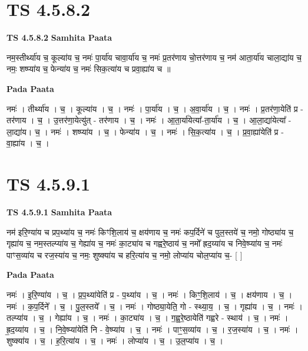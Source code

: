 \documentclass[17pt]{extarticle}
\begin{document}
\section*{ TS 4.5.8.2 }

\textbf{TS 4.5.8.2 } \newline
\textbf{Samhita Paata} \newline

नम॒स्तीर्थ्या॑य च॒ कूल्या॑य च॒ नमः॑ पा॒र्या॑य चावा॒र्या॑य च॒ नमः॑ प्र॒तर॑णाय चो॒त्तर॑णाय च॒ नम॑ आता॒र्या॑य चाला॒द्या॑य च॒ नमः॒ शष्प्या॑य च॒ फेन्या॑य च॒ नमः॑ सिक॒त्या॑य च प्रवा॒ह्या॑य च ॥ \newline

\textbf{Pada Paata} \newline

नमः॑ । तीर्थ्या॑य । च॒ । कूल्या॑य । च॒ । नमः॑ । पा॒र्या॑य । च॒ । अ॒वा॒र्या॑य । च॒ । नमः॑ । प्र॒तर॑णा॒येति॑ प्र - तर॑णाय । च॒ । उ॒त्तर॑णा॒येत्यु॑त् - तर॑णाय । च॒ । नमः॑ । आ॒ता॒र्या॑येत्या᳚-ता॒र्या॑य । च॒ । आ॒ला॒द्या॑येत्या᳚ - ला॒द्या॑य। च॒ । नमः॑ । शष्प्या॑य । च॒ । फेन्या॑य । च॒ । नमः॑ । सि॒क॒त्या॑य । च॒ । प्र॒वा॒ह्या॑येति॑ प्र - वा॒ह्या॑य । च॒ ।  \newline




\section*{ TS 4.5.9.1 }

\textbf{TS 4.5.9.1 } \newline
\textbf{Samhita Paata} \newline

नम॑ इरि॒ण्या॑य च प्रप॒थ्या॑य च॒ नमः॑ किꣳशि॒लाय॑ च॒ क्षय॑णाय च॒ नमः॑ कप॒र्दिने॑ च पुल॒स्तये॑ च॒ नमो॒ गोष्ठ्या॑य च॒ गृह्या॑य च॒ नम॒स्तल्प्या॑य च॒ गेह्या॑य च॒ नमः॑ का॒ट्या॑य च गह्वरे॒ष्ठाय॑ च॒ नमो᳚ ह्रद॒य्या॑य च निवे॒ष्प्या॑य च॒ नमः॑ पाꣳस॒व्या॑य च रज॒स्या॑य च॒ नमः॒ शुष्क्या॑य च हरि॒त्या॑य च॒ नमो॒ लोप्या॑य चोल॒प्या॑य च॒- [  ] \newline

\textbf{Pada Paata} \newline

नमः॑ । इ॒रि॒ण्या॑य । च॒ । प्र॒प॒थ्या॑येति॑ प्र - प॒थ्या॑य । च॒ । नमः॑ । किꣳ॒॒शि॒लाय॑ । च॒ । क्षय॑णाय । च॒ । नमः॑ । क॒प॒र्दिने᳚ । च॒ । पु॒ल॒स्तये᳚ । च॒ । नमः॑ । गोष्ठ्या॒येति॒ गो - स्थ्या॒य॒ । च॒ । गृह्या॑य । च॒ । नमः॑ । तल्प्या॑य । च॒ । गेह्या॑य । च॒ । नमः॑ । का॒ट्या॑य । च॒ । ग॒ह्व॒रे॒ष्ठायेति॑ गह्वरे - स्थाय॑ । च॒ । नमः॑ । ह्र॒द॒य्या॑य । च॒ । नि॒वे॒ष्प्या॑येति॑ नि - वे॒ष्प्या॑य । च॒ । नमः॑ । पाꣳ॒॒स॒व्या॑य । च॒ । र॒ज॒स्या॑य । च॒ । नमः॑ । शुष्क्या॑य । च॒ । ह॒रि॒त्या॑य । च॒ । नमः॑ । लोप्या॑य । च॒ । उ॒ल॒प्या॑य । च॒ ।  \newline
\end{document}
